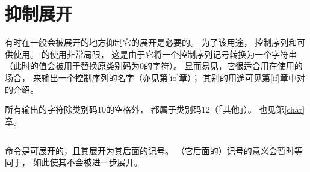 \documentclass{book}
\begin{document}
\section{抑制展开}

有时在一般会被展开的地方抑制它的展开是必要的。
为了该用途，
控制序列和可供使用。
的使用非常局限，
这是由于它将一个控制序列记号转换为一个字符串
（此时的值会被用于替换原类别码为0的字符）。
显而易见，它很适合用在使用的场合，                        
来输出一个控制序列的名字（亦见第\ref{io}章）；
其别的用途可见第\ref{if}章中对的介绍。

所有输出的字符除类别码10的空格外，
都属于类别码12（「其他」）。
也见第\ref{char}章。

\subsection{\protect{}}

命令是可展开的，且其展开为其后面的记号。
（它后面的）记号的意义会暂时等同于，
如此使其不会被进一步展开。
\end{document}
